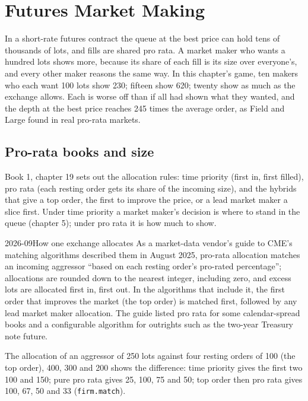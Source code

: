 \chapter{Futures Market Making}\label{ch:hf:futures-market-making}

In a short-rate futures contract the queue at the best price can hold tens of thousands of lots, and fills are shared pro rata. A market maker who
wants a hundred lots shows more, because its share of each fill is its size over everyone's, and every other maker reasons the same way. In this
chapter's game, ten makers who each want 100 lots show 230; fifteen show 620; twenty show as much as the exchange allows. Each is worse off than if
all had shown what they wanted, and the depth at the best price reaches 245 times the average order, as Field and Large found in real pro-rata
markets.

\section{Pro-rata books and size}

Book 1, chapter 19 sets out the allocation rules: time priority (first in, first filled), pro rata (each resting order gets its share of the
incoming size), and the hybrids that give a top order, the first to improve the price, or a lead market maker a slice first. Under time priority a
market maker's decision is where to stand in the queue (chapter 5); under pro rata it is how much to show.

\begin{dated}{2026-09}{How one exchange allocates}\label{dat:hf:futures-market-making:cme}
As a market-data vendor's guide to CME's matching algorithms described them in August 2025, pro-rata allocation matches an incoming aggressor ``based
on each resting order's pro-rated percentage''; allocations are rounded down to the nearest integer, including zero, and excess lots are allocated
first in, first out. In the algorithms that include it, the first order that improves the market (the top order) is matched first, followed by any
lead market maker allocation. The guide listed pro rata for some calendar-spread books and a configurable algorithm for outrights such as the
two-year Treasury note future.
\end{dated}

The allocation of an aggressor of 250 lots against four resting orders of 100 (the top order), 400, 300 and 200 shows the difference: time priority
gives the first two 100 and 150; pure pro rata gives 25, 100, 75 and 50; top order then pro rata gives 100, 67, 50 and 33 (\texttt{firm.match}).


